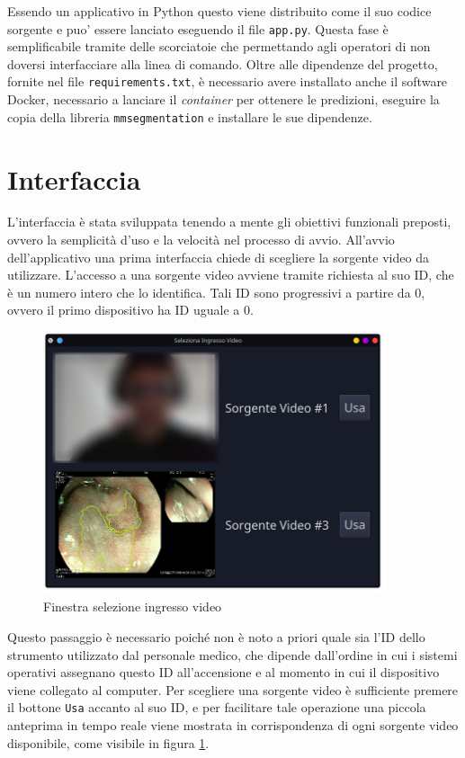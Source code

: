 Essendo un applicativo in Python questo viene distribuito
come il suo codice sorgente e puo' essere lanciato eseguendo
il file {\tt app.py}.
Questa fase è semplificabile tramite delle scorciatoie che
permettando agli operatori di non doversi interfacciare alla
linea di comando.
Oltre alle dipendenze del progetto, fornite nel file
{\tt requirements.txt}, è necessario avere installato anche
il software Docker, necessario a lanciare il {\it container}
per ottenere le predizioni, eseguire la copia della
libreria {\tt mmsegmentation} e installare le sue dipendenze.


\section{Interfaccia}

L'interfaccia è stata sviluppata tenendo a mente gli obiettivi
funzionali preposti, ovvero la semplicità d'uso e la velocità
nel processo di avvio.
All'avvio dell'applicativo una prima interfaccia chiede di
scegliere la sorgente video da utilizzare.
L'accesso a una sorgente video avviene tramite richiesta
al suo ID, che è un numero intero che lo identifica.
Tali ID sono progressivi a partire da 0, ovvero il primo
dispositivo ha ID uguale a 0.

\begin{figure}[H]
    \includegraphics[width=0.9\textwidth]{./assets/app-splashscreen.png}
    \caption{\label{fig:app-splashscreen} Finestra selezione ingresso video}
\end{figure}

Questo passaggio è necessario poiché non è noto a priori
quale sia l'ID dello strumento utilizzato dal personale medico,
che dipende dall'ordine in cui i sistemi operativi assegnano
questo ID all'accensione e al momento in cui il dispositivo
viene collegato al computer.
Per scegliere una sorgente video è sufficiente premere
il bottone {\tt Usa} accanto al suo ID, e per facilitare
tale operazione una piccola anteprima in tempo reale
viene mostrata in corrispondenza di ogni sorgente video
disponibile, come visibile in figura \ref{fig:app-splashscreen}.

